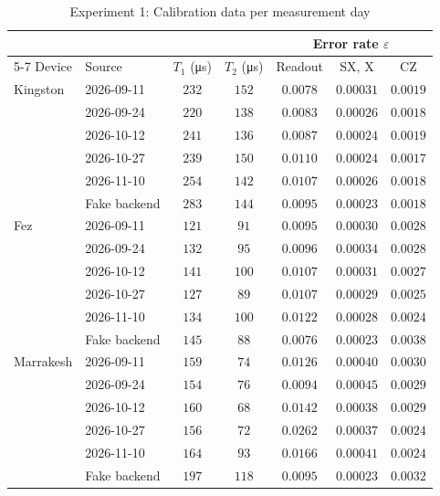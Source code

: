 \begin{table}[htbp]
\centering
\caption{Experiment 1: Calibration data per measurement day}
\label{tab:exp1_calibration}
\begin{tabular*}{\textwidth}{@{\extracolsep{\fill}}ll*{5}{c}@{}}
\toprule
 & & & & \multicolumn{3}{c}{Error rate $\varepsilon$} \\
\cmidrule(l){5-7}
Device & Source & $T_1$ (\si{\micro\second}) & $T_2$ (\si{\micro\second}) & Readout & SX, X & CZ \\
\midrule
Kingston & 2026-09-11 & $232$ & $152$ & $0.0078$ & $0.00031$ & $0.0019$ \\
 & 2026-09-24 & $220$ & $138$ & $0.0083$ & $0.00026$ & $0.0018$ \\
 & 2026-10-12 & $241$ & $136$ & $0.0087$ & $0.00024$ & $0.0019$ \\
 & 2026-10-27 & $239$ & $150$ & $0.0110$ & $0.00024$ & $0.0017$ \\
 & 2026-11-10 & $254$ & $142$ & $0.0107$ & $0.00026$ & $0.0018$ \\
 & Fake backend & $283$ & $144$ & $0.0095$ & $0.00023$ & $0.0018$ \\
\midrule
Fez & 2026-09-11 & $121$ & $91$ & $0.0095$ & $0.00030$ & $0.0028$ \\
 & 2026-09-24 & $132$ & $95$ & $0.0096$ & $0.00034$ & $0.0028$ \\
 & 2026-10-12 & $141$ & $100$ & $0.0107$ & $0.00031$ & $0.0027$ \\
 & 2026-10-27 & $127$ & $89$ & $0.0107$ & $0.00029$ & $0.0025$ \\
 & 2026-11-10 & $134$ & $100$ & $0.0122$ & $0.00028$ & $0.0024$ \\
 & Fake backend & $145$ & $88$ & $0.0076$ & $0.00023$ & $0.0038$ \\
\midrule
Marrakesh & 2026-09-11 & $159$ & $74$ & $0.0126$ & $0.00040$ & $0.0030$ \\
 & 2026-09-24 & $154$ & $76$ & $0.0094$ & $0.00045$ & $0.0029$ \\
 & 2026-10-12 & $160$ & $68$ & $0.0142$ & $0.00038$ & $0.0029$ \\
 & 2026-10-27 & $156$ & $72$ & $0.0262$ & $0.00037$ & $0.0024$ \\
 & 2026-11-10 & $164$ & $93$ & $0.0166$ & $0.00041$ & $0.0024$ \\
 & Fake backend & $197$ & $118$ & $0.0095$ & $0.00023$ & $0.0032$ \\
\bottomrule
\end{tabular*}
\end{table}
